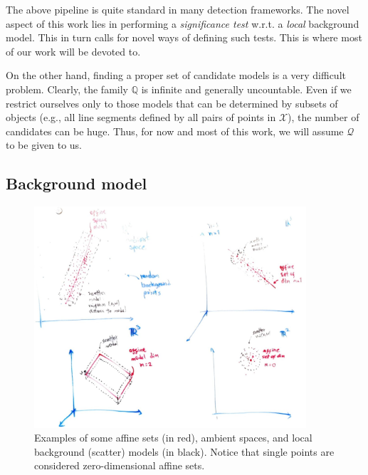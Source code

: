 \documentclass[a4page,11pt]{article}
\newcommand{\set}[1]{\mathcal{#1}}%
\newcommand{\spc}[1]{\mathbb{#1}}%
\begin{document}
The above pipeline is quite standard in many detection frameworks. The novel aspect of this work lies in performing a \emph{significance test} w.r.t. a \emph{local} background model. This in turn calls for novel ways of defining such tests. This is where most of our work will be devoted to. 

On the other hand, finding a proper set of candidate models is a very difficult problem. Clearly, the family $\spc{Q}$ is infinite and generally uncountable. Even if we restrict ourselves only to those models that can be determined by subsets of objects (e.g., all line segments defined by all pairs of points in $\set{X}$), the number of candidates can be huge.
Thus, for now and most of this work, we will assume $\set{Q}$ to be given to us.


\subsection{Background model}


\begin{figure}
\centering\includegraphics[width=0.9\textwidth]{examples}
\caption{\label{fig:examples}Examples of some affine sets (in red), ambient spaces, and local background (scatter) models (in black). Notice that single points are considered zero-dimensional affine sets.}
\end{figure}
\end{document}
